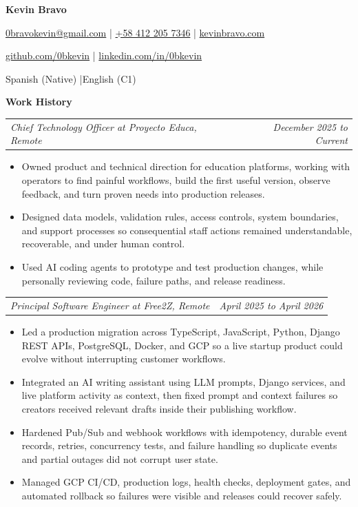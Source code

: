 \documentclass[10pt,letterpaper]{article}
\makeatletter
\newcommand{\bodyfont}{\fontsize{10.5}{15.75}\selectfont}
\newcommand{\contactfont}{\fontsize{12}{15}\selectfont}
\newcommand{\sectiontitle}[1]{%
  \vspace{4pt}
  {\bodyfont\textbf{#1}}\par
  \nopagebreak[4]
  \vspace{2pt}
}
\newcommand{\roleline}[2]{%
  \begin{tabularx}{\textwidth}{@{}Xr@{}}
    \bodyfont\textit{#1} & \bodyfont\textit{#2}
  \end{tabularx}
  \nopagebreak[4]
  \vspace{1pt}
}
\makeatother
\begin{document}
\bodyfont
\raggedright

\begin{center}
  {\fontsize{14}{17}\selectfont\textbf{Kevin Bravo}}\par
  \vspace{3pt}
  {\contactfont
    \href{mailto:0bravokevin@gmail.com}{0bravokevin@gmail.com}
    \enspace|\enspace
    \href{tel:+584122057346}{+58 412 205 7346}
    \enspace|\enspace
    \href{https://kevinbravo.com}{kevinbravo.com}
  }\par
  {\contactfont
    \href{https://github.com/0bkevin}{github.com/0bkevin}
    \enspace|\enspace
    \href{https://www.linkedin.com/in/0bkevin/}{linkedin.com/in/0bkevin}
  }\par
  {\contactfont Spanish (Native) \enspace|\enspace English (C1)}
\end{center}

\sectiontitle{Work History}

\roleline{Chief Technology Officer at Proyecto Educa, Remote}{December 2025 to Current}
\begin{itemize}
  \item Owned product and technical direction for education platforms, working with operators to find painful workflows, build the first useful version, observe feedback, and turn proven needs into production releases.
  \item Designed data models, validation rules, access controls, system boundaries, and support processes so consequential staff actions remained understandable, recoverable, and under human control.
  \item Used AI coding agents to prototype and test production changes, while personally reviewing code, failure paths, and release readiness.
\end{itemize}

\vspace{3pt}
\roleline{Principal Software Engineer at Free2Z, Remote}{April 2025 to April 2026}
\begin{itemize}
  \item Led a production migration across TypeScript, JavaScript, Python, Django REST APIs, PostgreSQL, Docker, and GCP so a live startup product could evolve without interrupting customer workflows.
  \item Integrated an AI writing assistant using LLM prompts, Django services, and live platform activity as context, then fixed prompt and context failures so creators received relevant drafts inside their publishing workflow.
  \item Hardened Pub/Sub and webhook workflows with idempotency, durable event records, retries, concurrency tests, and failure handling so duplicate events and partial outages did not corrupt user state.
  \item Managed GCP CI/CD, production logs, health checks, deployment gates, and automated rollback so failures were visible and releases could recover safely.
\end{itemize}
\end{document}
